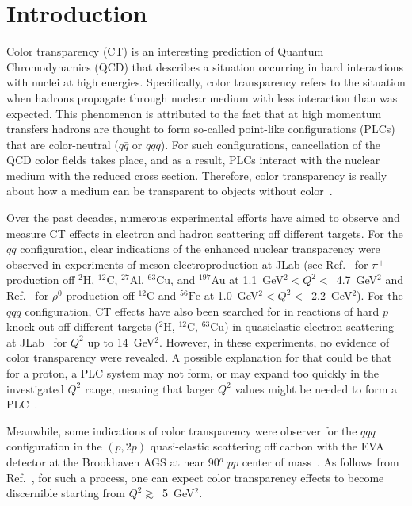

\newpage
\chapter{Introduction}
\mbox{}\vspace{-\baselineskip}

Color transparency (CT) is an interesting prediction of Quantum Chromodynamics (QCD) that describes a situation occurring in hard interactions with nuclei at high energies. Specifically, color transparency refers to the situation when hadrons propagate through nuclear medium with less interaction than was expected. This phenomenon is attributed to the fact that at high momentum transfers hadrons are thought to form so-called point-like configurations (PLCs) that are color-neutral ($q\bar q$ or $qqq$). For such configurations, cancellation of the QCD color fields takes place, and as a result, PLCs interact with the nuclear medium with the reduced cross section. Therefore, color transparency is really about how a medium can be transparent to objects without color~\cite{Holly_color_t,Dutta_color_t}.



Over the past decades, numerous experimental efforts have aimed to observe and measure CT effects in electron and hadron scattering off different targets. For the $q\bar q$ configuration, clear indications of the enhanced nuclear transparency were observed in experiments of meson electroproduction at JLab (see Ref.~\cite{Clasie:2007aa} for $\pi^+$-production off ${}^{2}\text{H}$, ${}^{12}\text{C}$, ${}^{27}\text{Al}$, ${}^{63}\text{Cu}$, and ${}^{197}\text{Au}$ at 1.1~GeV$^{2}<Q^{2}<$~4.7~GeV$^{2}$ and Ref.~\cite{ElFassi:2012hsy} for $\rho^{0}$-production off ${}^{12}\text{C}$ and ${}^{56}\text{Fe}$ at 1.0~GeV$^{2}<Q^{2}<$~2.2~GeV$^{2}$). For the $qqq$ configuration, CT effects have also been searched for in reactions of hard $p$ knock-out off different targets (${}^{2}\text{H}$, ${}^{12}\text{C}$, ${}^{63}\text{Cu}$) in quasielastic electron scattering at JLab~\cite{Garrow:2001di,HallC:2020ijh} for $Q^{2}$ up to 14~GeV$^{2}$. However, in these experiments, no evidence of color transparency were revealed. A possible explanation for that could be that for a proton, a PLC system may not form, or may expand too quickly in the investigated $Q^2$ range, meaning that larger $Q^2$ values might be needed to form a PLC~\cite{Brodsky:2022bum,Frankfurt:2022cyk}.



Meanwhile, some indications of color transparency were observer for the $qqq$ configuration in the $(p,2p)$ quasi-elastic scattering off carbon with the EVA detector at the Brookhaven AGS at near 90$^{o}$ $pp$ center of mass~\cite{PhysRevLett.87.212301}. As follows from Ref.~\cite{PhysRevLett.87.212301}, for such a process, one can expect color transparency effects to become discernible starting from $Q^{2}\gtrsim$~5~GeV$^{2}$. 

